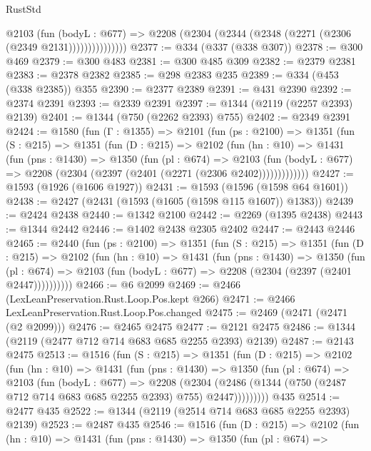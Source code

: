 \begin{lexlean}{RustStd}
\begin{coremodule}
                  @2103
                    (fun (bodyL : @677) =>
                    @2208 (@2304 (@2344 (@2348 (@2271 (@2306 (@2349 @2131)))))))))))))))
@2377 := @334 (@337 (@338 @307))
@2378 := @300 @469
@2379 := @300 @483
@2381 := @300 @485 @309
@2382 := @2379 @2381
@2383 := @2378 @2382
@2385 := @298 @2383 @235
@2389 := @334 (@453 (@338 @2385)) @355
@2390 := @2377 @2389
@2391 := @431 @2390
@2392 := @2374 @2391
@2393 := @2339 @2391
@2397 := @1344 (@2119 (@2257 @2393) @2139)
@2401 := @1344 (@750 (@2262 @2393) @755)
@2402 := @2349 @2391
@2424 := @1580
    (fun (Γ : @1355) =>
    @2101
      (fun (ps : @2100) =>
      @1351
        (fun (S : @215) =>
        @1351
          (fun (D : @215) =>
          @2102
            (fun (hn : @10) =>
            @1431
              (fun (pns : @1430) =>
              @1350
                (fun (pl : @674) =>
                @2103
                  (fun (bodyL : @677) => @2208 (@2304 (@2397 (@2401 (@2271 (@2306 @2402)))))))))))))
@2427 := @1593 (@1926 (@1606 @1927))
@2431 := @1593 (@1596 (@1598 @64 @1601))
@2438 := @2427 (@2431 (@1593 (@1605 (@1598 @115 @1607)) @1383))
@2439 := @2424 @2438
@2440 := @1342 @2100
@2442 := @2269 (@1395 @2438)
@2443 := @1344 @2442
@2446 := @1402 @2438 @2305 @2402
@2447 := @2443 @2446
@2465 := @2440
    (fun (ps : @2100) =>
    @1351
      (fun (S : @215) =>
      @1351
        (fun (D : @215) =>
        @2102
          (fun (hn : @10) =>
          @1431
            (fun (pns : @1430) =>
            @1350
              (fun (pl : @674) =>
              @2103 (fun (bodyL : @677) => @2208 (@2304 (@2397 (@2401 @2447))))))))))
@2466 := @6 @2099
@2469 := @2466 (LexLeanPreservation.Rust.Loop.Pos.kept @266)
@2471 := @2466 LexLeanPreservation.Rust.Loop.Pos.changed
@2475 := @2469 (@2471 (@2471 (@2 @2099)))
@2476 := @2465 @2475
@2477 := @2121 @2475
@2486 := @1344 (@2119 (@2477 @712 @714 @683 @685 @2255 @2393) @2139)
@2487 := @2143 @2475
@2513 := @1516
    (fun (S : @215) =>
    @1351
      (fun (D : @215) =>
      @2102
        (fun (hn : @10) =>
        @1431
          (fun (pns : @1430) =>
          @1350
            (fun (pl : @674) =>
            @2103
              (fun (bodyL : @677) =>
              @2208
                (@2304
                  (@2486 (@1344 (@750 (@2487 @712 @714 @683 @685 @2255 @2393) @755) @2447)))))))))
    @435
@2514 := @2477 @435
@2522 := @1344 (@2119 (@2514 @714 @683 @685 @2255 @2393) @2139)
@2523 := @2487 @435
@2546 := @1516
    (fun (D : @215) =>
    @2102
      (fun (hn : @10) =>
      @1431
        (fun (pns : @1430) =>
        @1350
          (fun (pl : @674) =>

\end{coremodule}
\end{lexlean}
